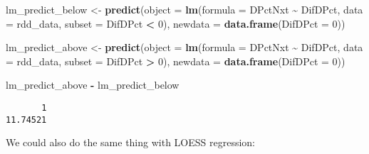 \documentclass[
  12pt,
  leqno]{article}
\newenvironment{Shaded}{\begin{snugshade}}{\end{snugshade}}
\newcommand{\AttributeTok}[1]{\textcolor[rgb]{0.13,0.29,0.53}{#1}}
\newcommand{\DecValTok}[1]{\textcolor[rgb]{0.00,0.00,0.81}{#1}}
\newcommand{\FunctionTok}[1]{\textcolor[rgb]{0.13,0.29,0.53}{\textbf{#1}}}
\newcommand{\NormalTok}[1]{#1}
\newcommand{\OtherTok}[1]{\textcolor[rgb]{0.56,0.35,0.01}{#1}}
\newcommand{\SpecialCharTok}[1]{\textcolor[rgb]{0.81,0.36,0.00}{\textbf{#1}}}
\begin{document}
\begin{Shaded}
\begin{Highlighting}[]
\NormalTok{lm\_predict\_below }\OtherTok{\textless{}{-}} \FunctionTok{predict}\NormalTok{(}\AttributeTok{object =} \FunctionTok{lm}\NormalTok{(}\AttributeTok{formula =}\NormalTok{ DPctNxt }\SpecialCharTok{\textasciitilde{}}\NormalTok{ DifDPct, }\AttributeTok{data =}\NormalTok{ rdd\_data,}
    \AttributeTok{subset =}\NormalTok{ DifDPct }\SpecialCharTok{\textless{}} \DecValTok{0}\NormalTok{), }\AttributeTok{newdata =} \FunctionTok{data.frame}\NormalTok{(}\AttributeTok{DifDPct =} \DecValTok{0}\NormalTok{))}

\NormalTok{lm\_predict\_above }\OtherTok{\textless{}{-}} \FunctionTok{predict}\NormalTok{(}\AttributeTok{object =} \FunctionTok{lm}\NormalTok{(}\AttributeTok{formula =}\NormalTok{ DPctNxt }\SpecialCharTok{\textasciitilde{}}\NormalTok{ DifDPct, }\AttributeTok{data =}\NormalTok{ rdd\_data,}
    \AttributeTok{subset =}\NormalTok{ DifDPct }\SpecialCharTok{\textgreater{}} \DecValTok{0}\NormalTok{), }\AttributeTok{newdata =} \FunctionTok{data.frame}\NormalTok{(}\AttributeTok{DifDPct =} \DecValTok{0}\NormalTok{))}

\NormalTok{lm\_predict\_above }\SpecialCharTok{{-}}\NormalTok{ lm\_predict\_below}
\end{Highlighting}
\end{Shaded}

\begin{verbatim}
       1 
11.74521 
\end{verbatim}

\normalsize

We could also do the same thing with LOESS regression:

\scriptsize
\end{document}
